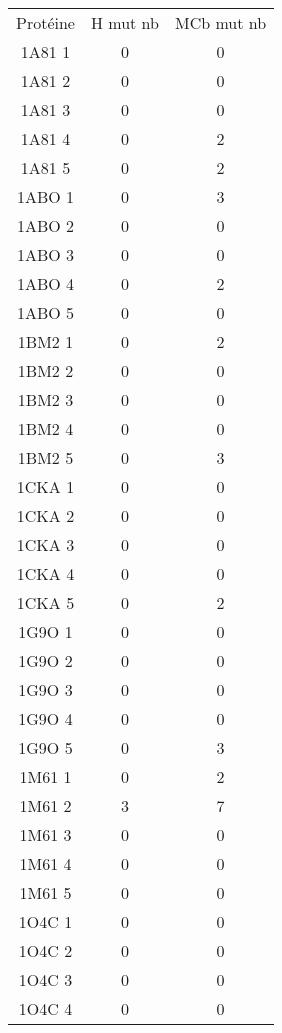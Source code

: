     \begin{table}[h]
      \centering

      \begin{tabular}{ccc}

        \toprule
        Protéine & H mut nb & MCb mut nb \\
        \cmidrule{1-3}
        1A81 1 & 0  & 0 \\    
        1A81 2 & 0  & 0 \\
        1A81 3 & 0  & 0 \\
        1A81 4 & 0  & 2 \\
        1A81 5 & 0  & 2 \\
        1ABO 1 & 0  & 3 \\ 
        1ABO 2 & 0  & 0 \\
        1ABO 3 & 0  & 0 \\
        1ABO 4 & 0  & 2 \\
        1ABO 5 & 0  & 0 \\
        1BM2 1 & 0  & 2 \\
        1BM2 2 & 0  & 0 \\
        1BM2 3 & 0  & 0 \\
        1BM2 4 & 0  & 0 \\
        1BM2 5 & 0  & 3 \\
        1CKA 1 & 0  & 0 \\
        1CKA 2 & 0  & 0 \\
        1CKA 3 & 0  & 0 \\
        1CKA 4 & 0  & 0 \\
        1CKA 5 & 0  & 2 \\
        1G9O 1 & 0  & 0 \\
        1G9O 2 & 0  & 0 \\
        1G9O 3 & 0  & 0 \\
        1G9O 4 & 0  & 0 \\
        1G9O 5 & 0  & 3 \\
        1M61 1 & 0  & 2 \\
        1M61 2 & 3  & 7 \\
        1M61 3 & 0  & 0 \\
        1M61 4 & 0  & 0 \\
        1M61 5 & 0  & 0 \\
        1O4C 1 & 0  & 0 \\
        1O4C 2 & 0  & 0 \\
        1O4C 3 & 0  & 0 \\
        1O4C 4 & 0  & 0 \\

\end{tabular}
\end{table}
